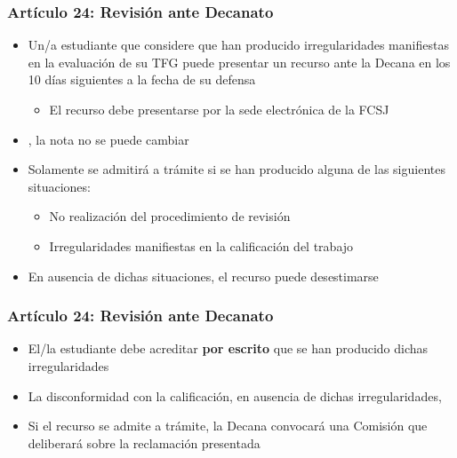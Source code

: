 \documentclass[aspectratio=43]{beamer}
\begin{document}
\begin{frame}
\frametitle{Artículo 24: Revisión ante Decanato}
\centering

\begin{itemize}
  \item Un/a estudiante que considere que han producido irregularidades manifiestas en la evaluación de su TFG puede presentar un recurso ante la Decana en los 10 días siguientes a la fecha de su defensa
  \begin{itemize}
    \item El recurso debe presentarse por la sede electrónica de la FCSJ
  \end{itemize}
  \item {}, la nota no se puede cambiar
  \item Solamente se admitirá a trámite si se han producido alguna de las siguientes situaciones:
  \begin{itemize}
    \item No realización del procedimiento de revisión
    \item Irregularidades manifiestas en la calificación del trabajo
  \end{itemize}
  \item En ausencia de dichas situaciones, el recurso puede desestimarse
\end{itemize}

\end{frame}

\begin{frame}
\frametitle{Artículo 24: Revisión ante Decanato}
\centering

\begin{itemize}
  \item El/la estudiante debe acreditar \textbf{por escrito} que se han producido dichas irregularidades
  \item La disconformidad con la calificación, en ausencia de dichas irregularidades, 
  \item Si el recurso se admite a trámite, la Decana convocará una Comisión que deliberará sobre la reclamación presentada
\end{itemize}

\end{frame}
\end{document}
